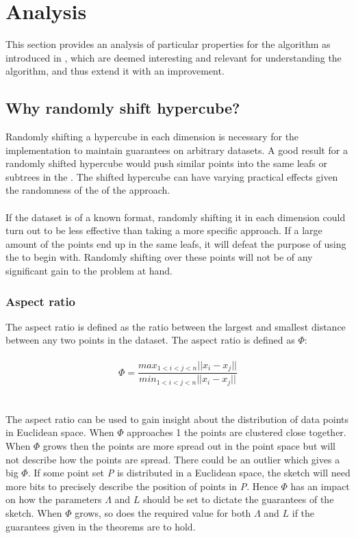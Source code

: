 \section{Analysis}
\label{analysis}
This section provides an analysis of particular properties for the \qs{} algorithm as introduced in \cite{wagner17}, which are deemed interesting and relevant for understanding the algorithm, and thus extend it with an improvement.


\subsection{Why randomly shift hypercube?}
Randomly shifting a hypercube in each dimension is necessary for the \qs{} implementation to maintain guarantees on arbitrary datasets. A good result for a randomly shifted hypercube would push similar points into the same leafs or subtrees in the \qt{}. The shifted hypercube can have varying practical effects given the randomness of the of the approach.
\\
\\
If the dataset is of a known format, randomly shifting it in each dimension could turn out to be less effective than taking a more specific approach. If a large amount of the points end up in the same leafs, it will defeat the purpose of using the \qt{} to begin with. Randomly shifting over these points will not be of any significant gain to the problem at hand.

\subsubsection{Aspect ratio}
\label{sec:aspect_ratio}
The aspect ratio is defined as the ratio between the largest and smallest distance between any two points in the dataset\cite{wagner17}. The aspect ratio is defined as $\Phi$:
\\
\\
$$ \Phi = \frac{max_{1<i<j<n} || x_i - x_j || }{min_{1<i<j<n} || x_i - x_j || } $$
\\
\\
The aspect ratio can be used to gain insight about the distribution of data points in Euclidean space. When $\Phi$ approaches 1 the points are clustered close together. When $\Phi$ grows then the points are more spread out in the point space but will not describe how the points are spread. There could be an outlier which gives a big $\Phi$. If some point set \textit{P} is distributed in a Euclidean space, the sketch will need more bits to precisely describe the position of points in \textit{P}. Hence $\Phi$ has an impact on how the parameters $\Lambda$ and $L$ should be set to dictate the guarantees of the sketch. When $\Phi$ grows, so does the required value for both $\Lambda$ and $L$ if the guarantees given in the theorems are to hold. 

